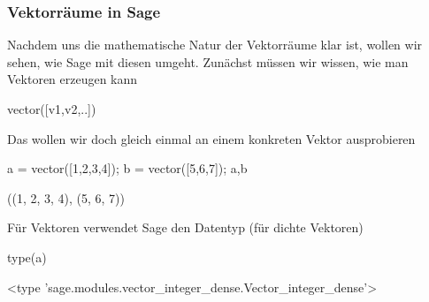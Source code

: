 \documentclass[fontsize=12pt,paper=a4,twoside,bibtotoc,idxtotoc,
liststotoc,pagesize,BCOR1.2cm,DIV15,chapterprefix,pagesize=pdftex]{scrbook}
\theoremstyle{plain}
\theoremstyle{definition}
\theoremstyle{remark}
\begin{document}
\subsubsection{Vektorräume in Sage}
Nachdem uns die mathematische Natur der Vektorräume klar ist, wollen wir sehen, wie Sage mit diesen umgeht. Zunächst müssen wir wissen, wie man Vektoren erzeugen kann
\begin{sagein}
vector([v1,v2,..]) 
\end{sagein}
Das wollen wir doch gleich einmal an einem konkreten Vektor ausprobieren
\begin{sagein}
a = vector([1,2,3,4]); b = vector([5,6,7]); a,b
\end{sagein}
\begin{sageout}
((1, 2, 3, 4), (5, 6, 7))
\end{sageout}
Für Vektoren verwendet Sage den Datentyp  (für dichte Vektoren)
\begin{sagein}
type(a)
\end{sagein}
\begin{sageout}
<type 'sage.modules.vector_integer_dense.Vector_integer_dense'>
\end{sageout}
\end{document}
